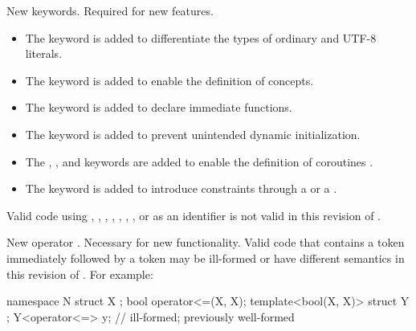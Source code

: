 \change
New keywords.
\rationale
Required for new features.
\begin{itemize}
\item
{}%
The  keyword is added to differentiate
the types of ordinary and UTF-8 literals.
\item
The  keyword is
added to enable the definition of concepts.
\item
The  keyword is added to
declare immediate functions.
\item
The  keyword is added to
prevent unintended dynamic initialization.
\item
The , , and  keywords are added
to enable the definition of coroutines .
\item
The  keyword is added
to introduce constraints through a 
or a .
\end{itemize}
\effectafteritemize
Valid \CppXVII{} code using
,
,
,
,
, , ,
or 
as an identifier is not valid in this revision of \Cpp{}.

\change
New operator \tcode{<=>}.
\rationale
Necessary for new functionality.
\effect
Valid \CppXVII{} code that contains a \tcode{<=} token
immediately followed by a \tcode{>} token
may be ill-formed or have different semantics in this revision of \Cpp{}.
For example:
\begin{codeblock}
namespace N {
  struct X {};
  bool operator<=(X, X);
  template<bool(X, X)> struct Y {};
  Y<operator<=> y;              // ill-formed; previously well-formed
}
\end{codeblock}

